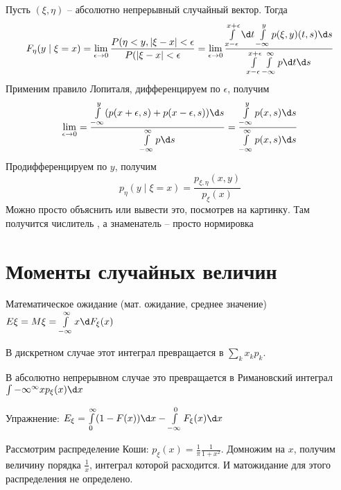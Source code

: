 Пусть $(\xi, \eta)$ -- абсолютно непрерывный случайный вектор. Тогда
$$F_{\eta}(y \mid \xi = x) = \lim\limits_{\epsilon \to 0} \frac{P(\eta < y, |\xi - x| < \epsilon}{P(|\xi - x| < \epsilon} = 
\lim\limits_{\epsilon \to 0} \frac{\int\limits_{x - \epsilon}^{x + \epsilon} \d t \int\limits_{-\infty}^y p(\xi, y) (t, s) \d s}{\int\limits_{x - \epsilon}^{x + \epsilon} \int\limits_{-\infty}^{\infty}p \d t \d s}$$
Применим правило Лопиталя, дифференцируем по $\epsilon$, получим
$$\lim\limits_{\epsilon \to 0} = \frac{\int\limits_{-\infty}^y (p(x + \epsilon, s) + p(x - \epsilon, s)) \d s}{\int\limits_{-\infty}^{\infty} p\d s} = \frac{\int\limits_{-\infty}^y p(x, s) \d s}{\int\limits_{-\infty}^{\infty}p(x, s) \d s}$$
Продифференцируем по $y$, получим
$$p_{\eta}(y \mid \xi = x) = \frac{p_{\xi, \eta}(x, y)}{p_{\xi}(x)}$$
Можно просто объяснить или вывести это, посмотрев на картинку. Там получится числитель \TODO, а знаменатель -- просто нормировка


\section{Моменты случайных величин}
\begin{Def}
    Математическое ожидание (мат. ожидание, среднее значение) $E\xi = M\xi = \int\limits_{-\infty}^\infty x \d F_\xi(x)$

    В дискретном случае этот интеграл превращается в $\sum\limits_k x_k p_k$.

    В абсолютно непрерывном случае это превращается в Римановский интеграл $\int\limits{-\infty}^\infty xp_\xi(x) \d x$
\end{Def}

Упражнение: $E_\xi = \int\limits_0^\infty (1 - F(x)) \d x - \int\limits_{-\infty}^0 F_\xi(x) \d x$

\begin{exmp}
Рассмотрим распределение Коши: $p_\xi(x) = \frac{1}{\pi}\frac{1}{1 + x^2}$. Домножим на $x$, получим величину порядка $\frac{1}{x}$, интеграл которой расходится. 
И матожидание для этого распределения не определено.
\end{exmp}

